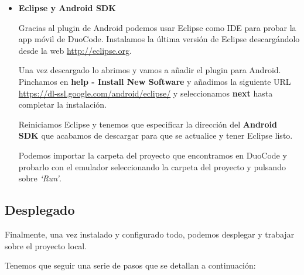\begin{itemize}
\item \textbf{Eclipse y Android SDK}

Gracias al plugin de Android podemos usar Eclipse como IDE para probar la app móvil de DuoCode. Instalamos la última versión de Eclipse descargándolo desde la web \url{http://eclipse.org}.

Una vez descargado lo abrimos y vamos a añadir el plugin para Android.
Pinchamos en \textbf{help - Install New Software} y añadimos la siguiente URL \url{https://dl-ssl.google.com/android/eclipse/} y seleccionamos \textbf{next} hasta completar la instalación.

Reiniciamos Eclipse y tenemos que especificar la dirección del \textbf{Android SDK} que acabamos de descargar para que se actualice y tener Eclipse listo.

Podemos importar la carpeta del proyecto que encontramos en DuoCode y probarlo con el emulador seleccionando la carpeta del proyecto y pulsando sobre \textit{`Run'}.

\end{itemize}

\subsection{Desplegado}

Finalmente, una vez instalado y configurado todo, podemos desplegar y trabajar sobre el proyecto local.

Tenemos que seguir una serie de pasos que se detallan a continuación:

